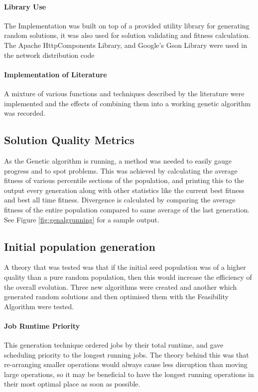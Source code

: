 \documentclass[14pt]{acmsiggraph}
\begin{document}
	\paragraph{Library Use}
	The Implementation was built on top of a provided utility library for generating random solutions, it was also used for solution validating and fitness calculation.\\
	The Apache HttpComponents Library, and Google's Gson Library were used in the network distribution code
	
	\paragraph{Implementation of Literature}
	A mixture of various functions and techniques described by the literature were implemented and the effects of combining them into a working genetic algorithm was recorded.
	
	\subsection{Solution Quality Metrics}
	As the Genetic algorithm is running, a method was needed to easily gauge progress and to spot problems. This was achieved by calculating the average fitness of various percentile sections of the population, and printing this to the output every generation along with other statistics like the current best fitness and  best all time fitness.  Divergence is calculated by comparing the average fitness of the entire population compared to same average of the last generation.
	See Figure \ref{fig:genalgrunning} for a sample output.
	
	\subsection{Initial population generation}
	A theory that was tested was that if the initial seed population was of a higher quality than a pure random population, then this would increase the efficiency of the overall evolution. Three new algorithms were created and another which generated random solutions and then optimised them with the Feasibility Algorithm were tested.
	
	\paragraph{Job Runtime Priority}
	This generation technique ordered jobs by their total runtime, and gave  scheduling priority to the longest running jobs. The theory behind this was that re-arranging smaller operations would always cause less disruption than moving large operations, so it may be beneficial to have the longest running operations in their most optimal place as soon as possible.
	
\end{document}
